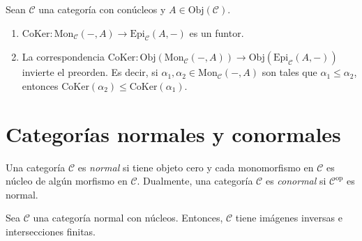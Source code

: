 \documentclass[tesis]{subfiles}
\begin{document}
\begin{Obs}\label{Mendoza-1.5.10*}
    Sean $\mathscr{C}$ una categoría con conúcleos y $A\in\text{Obj}(\mathscr{C})$. 

    \begin{enumerate}[label=(\arabic*)]
    
        \item $\text{CoKer}:\text{Mon}_\mathscr{C}(-,A)\to \text{Epi}_\mathscr{C}(A,-)$ es un funtor.

        \item La correspondencia $\text{CoKer}:\text{Obj}(\text{Mon}_\mathscr{C}(-,A))\to \text{Obj}(\text{Epi}_\mathscr{C}(A,-))$ invierte el preorden. Es decir, si $\alpha_1,\alpha_2\in\text{Mon}_\mathscr{C}(-,A)$ son tales que $\alpha_1\le\alpha_2$, entonces $\text{CoKer}(\alpha_2) \le \text{CoKer}(\alpha_1)$.
    \end{enumerate}
\end{Obs}

\section{Categorías normales y conormales} \label{Sec: Categorías normales y conormales}

\begin{Def}\label{Def: Categorías normales y conormales}
    Una categoría $\mathscr{C}$ es \emph{normal} si tiene objeto cero y cada monomorfismo en $\mathscr{C}$ es núcleo de algún morfismo en $\mathscr{C}$. Dualmente, una categoría $\mathscr{C}$ es \emph{conormal} si $\mathscr{C}^\text{op}$ es normal.
\end{Def}

\begin{Prop}\label{Mendoza-1.6.1}
    Sea $\mathscr{C}$ una categoría normal con núcleos. Entonces, $\mathscr{C}$ tiene imágenes inversas e intersecciones finitas.
\end{Prop}
\end{document}
